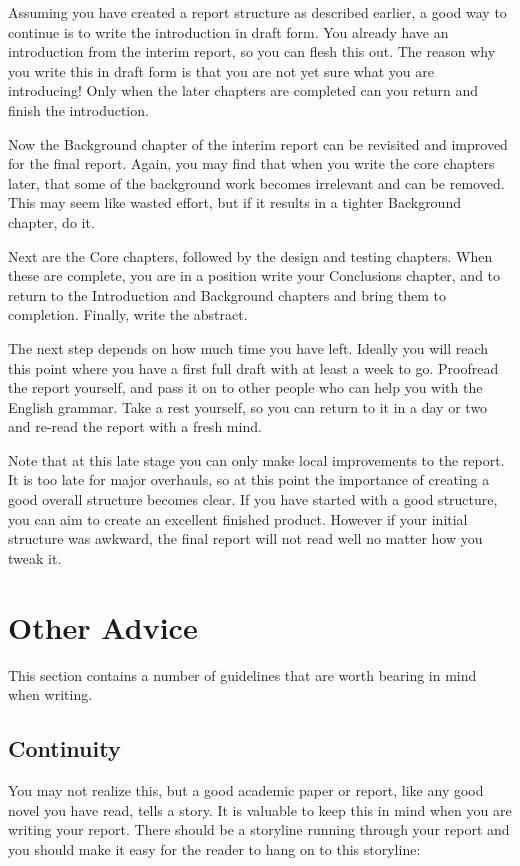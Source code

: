 \documentclass[]{final_report}
\begin{document}
Assuming you have created a report structure as described earlier, a good way to continue is to write the introduction in draft form. You already have an introduction from the interim report, so you can flesh this out. The reason why you write this in draft form is that you are not yet sure what you are introducing! Only when the later chapters are completed can you return and finish the introduction.

Now the Background chapter of the interim report can be revisited and improved for the final report. Again, you may find that when you write the core chapters later, that some of the background work becomes irrelevant and can be removed. This may seem like wasted effort, but if it results in a tighter Background chapter, do it.

Next are the Core chapters, followed by the design and testing chapters. When these are complete, you are in a position write your Conclusions chapter, and to return to the Introduction and Background chapters and bring them to completion. Finally, write the abstract.

The next step depends on how much time you have left. Ideally you will reach this point where you have a first full draft with at least a week to go. Proofread the report yourself, and pass it on to other people who can help you with the English grammar. Take a rest yourself, so you can return to it in a day or two and re-read the report with a fresh mind.

Note that at this late stage you can only make local improvements to the report. It is too late for major overhauls, so at this point the importance of creating a good overall structure becomes clear. If you have started with a good structure, you can aim to create an excellent finished product. However if your initial structure was awkward, the final report will not read well no matter how you tweak it.

\section{Other Advice}

This section contains a number of guidelines that are worth bearing in mind when writing.


\subsection{Continuity}

You may not realize this, but a good academic paper or report, like any good novel you have read, tells a story. It is valuable to keep this in mind when you are writing your report. There should be a storyline running through your report and you should make it easy for the reader to hang on to this storyline:
\end{document}
